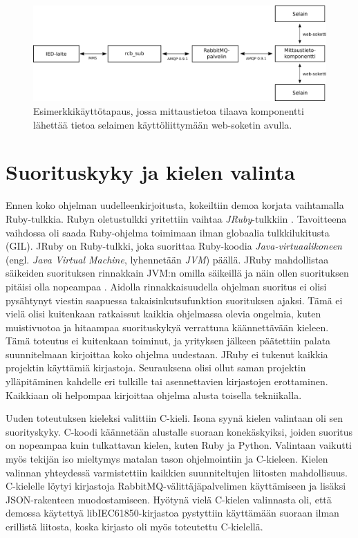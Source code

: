 \begin{figure}[ht!]
	\includegraphics[width=1\textwidth]{pictures/example-use-case.png}
	\caption{Esimerkkikäyttötapaus, jossa mittaustietoa tilaava komponentti lähettää tietoa selaimen käyttöliittymään web-soketin avulla.}
	\label{fig:example-use-case}
\end{figure}


\section{Suorituskyky ja kielen valinta}
Ennen koko ohjelman uudelleenkirjoitusta, kokeiltiin demoa korjata vaihtamalla Ruby-tulkkia. Rubyn oletustulkki yritettiin vaihtaa \emph{JRuby}-tulkkiin \cite{jruby-homepage}. Tavoitteena vaihdossa oli saada Ruby-ohjelma toimimaan ilman globaalia tulkkilukitusta (GIL). JRuby on Ruby-tulkki, joka suorittaa Ruby-koodia \emph{Java-virtuaalikoneen} (engl. \emph{Java Virtual Machine}, lyhennetään \emph{JVM}) päällä. JRuby mahdollistaa säikeiden suorituksen rinnakkain JVM:n omilla säikeillä ja näin ollen suorituksen pitäisi olla nopeampaa \mbox{\cite{Youssef2013}}. Aidolla rinnakkaisuudella ohjelman suoritus ei olisi pysähtynyt viestin saapuessa takaisinkutsufunktion suorituksen ajaksi. Tämä ei vielä olisi kuitenkaan ratkaissut kaikkia ohjelmassa olevia ongelmia, kuten muistivuotoa ja hitaampaa suorituskykyä verrattuna käännettävään kieleen. Tämä toteutus ei kuitenkaan toiminut, ja yrityksen jälkeen päätettiin palata suunnitelmaan kirjoittaa koko ohjelma uudestaan. JRuby ei tukenut kaikkia projektin käyttämiä kirjastoja. Seurauksena olisi ollut saman projektin ylläpitäminen kahdelle eri tulkille tai asennettavien kirjastojen erottaminen. Kaikkiaan oli helpompaa kirjoittaa ohjelma alusta toisella tekniikalla.

Uuden toteutuksen kieleksi valittiin C-kieli. Isona syynä kielen valintaan oli sen suorityskyky. C-koodi käännetään alustalle suoraan konekäskyiksi, joiden suoritus on nopeampaa kuin tulkattavan kielen, kuten Ruby ja Python. Valintaan vaikutti myös tekijän iso mieltymys matalan tason ohjelmointiin ja C-kieleen. Kielen valinnan yhteydessä varmistettiin kaikkien suunniteltujen liitosten mahdollisuus. C-kielelle löytyi kirjastoja RabbitMQ-välittäjäpalvelimen käyttämiseen ja lisäksi JSON-rakenteen muodostamiseen. Hyötynä vielä C-kielen valinnasta oli, että demossa käytettyä libIEC61850-kirjastoa pystyttiin käyttämään suoraan ilman erillistä liitosta, koska kirjasto oli myös toteutettu C-kielellä.


